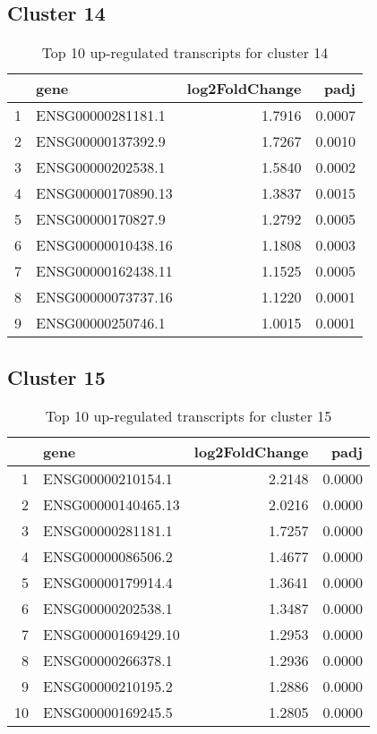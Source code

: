 \documentclass{article}
\begin{document}
\subsection{Cluster 14 }
\begin{table}[H]
\centering
\begin{tabularx}{\textwidth}{rlrr}
  \hline
 & gene & log2FoldChange & padj \\ 
  \hline
1 & ENSG00000281181.1 & 1.7916 & 0.0007 \\ 
  2 & ENSG00000137392.9 & 1.7267 & 0.0010 \\ 
  3 & ENSG00000202538.1 & 1.5840 & 0.0002 \\ 
  4 & ENSG00000170890.13 & 1.3837 & 0.0015 \\ 
  5 & ENSG00000170827.9 & 1.2792 & 0.0005 \\ 
  6 & ENSG00000010438.16 & 1.1808 & 0.0003 \\ 
  7 & ENSG00000162438.11 & 1.1525 & 0.0005 \\ 
  8 & ENSG00000073737.16 & 1.1220 & 0.0001 \\ 
  9 & ENSG00000250746.1 & 1.0015 & 0.0001 \\ 
   \hline
\end{tabularx}
\caption{Top 10 up-regulated transcripts for cluster 14} 
\label{tab:q3_1_14}
\end{table}
\subsection{Cluster 15 }
\begin{table}[H]
\centering
\begin{tabularx}{\textwidth}{rlrr}
  \hline
 & gene & log2FoldChange & padj \\ 
  \hline
1 & ENSG00000210154.1 & 2.2148 & 0.0000 \\ 
  2 & ENSG00000140465.13 & 2.0216 & 0.0000 \\ 
  3 & ENSG00000281181.1 & 1.7257 & 0.0000 \\ 
  4 & ENSG00000086506.2 & 1.4677 & 0.0000 \\ 
  5 & ENSG00000179914.4 & 1.3641 & 0.0000 \\ 
  6 & ENSG00000202538.1 & 1.3487 & 0.0000 \\ 
  7 & ENSG00000169429.10 & 1.2953 & 0.0000 \\ 
  8 & ENSG00000266378.1 & 1.2936 & 0.0000 \\ 
  9 & ENSG00000210195.2 & 1.2886 & 0.0000 \\ 
  10 & ENSG00000169245.5 & 1.2805 & 0.0000 \\ 
   \hline
\end{tabularx}
\caption{Top 10 up-regulated transcripts for cluster 15} 
\label{tab:q3_1_15}
\end{table}
\end{document}
